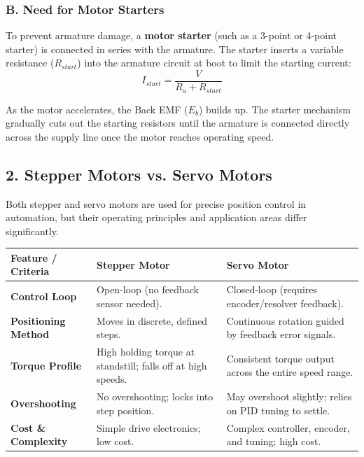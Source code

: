 \subsubsection{B. Need for Motor Starters}
To prevent armature damage, a \textbf{motor starter} (such as a 3-point or 4-point starter) is connected in series with the armature. The starter inserts a variable resistance ($R_{start}$) into the armature circuit at boot to limit the starting current:
\[ I_{start} = \frac{V}{R_a + R_{start}} \]

As the motor accelerates, the Back EMF ($E_b$) builds up. The starter mechanism gradually cuts out the starting resistors until the armature is connected directly across the supply line once the motor reaches operating speed.


\subsection{2. Stepper Motors vs. Servo Motors}
Both stepper and servo motors are used for precise position control in automation, but their operating principles and application areas differ significantly.

\begin{table}[H]
\centering
\begin{tabular}{|p{}|p{}|p{}|}
\hline
Feature / Criteria & Stepper Motor & Servo Motor \\
\hline
\textbf{Control Loop} & Open-loop (no feedback sensor needed). & Closed-loop (requires encoder/resolver feedback). \\
\hline
\textbf{Positioning Method} & Moves in discrete, defined steps. & Continuous rotation guided by feedback error signals. \\
\hline
\textbf{Torque Profile} & High holding torque at standstill; falls off at high speeds. & Consistent torque output across the entire speed range. \\
\hline
\textbf{Overshooting} & No overshooting; locks into step position. & May overshoot slightly; relies on PID tuning to settle. \\
\hline
\textbf{Cost \& Complexity} & Simple drive electronics; low cost. & Complex controller, encoder, and tuning; high cost. \\
\hline
\end{tabular}
\end{table}


